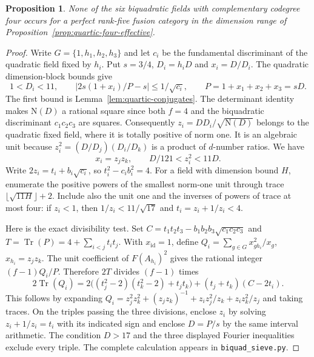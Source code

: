 \documentclass[11pt,a4paper]{article}
\newtheorem{proposition}[theorem]{Proposition}
\numberwithin{equation}{section}
\begin{document}
\begin{proposition}\label{prop:quartic-biquadratic-sieve}
None of the six biquadratic fields with complementary codegree four
occurs for a perfect rank-five fusion category in the dimension range
of Proposition~\ref{prop:quartic-four-effective}.
\end{proposition}
\begin{proof}
Write $G=\{1,h_1,h_2,h_3\}$ and let $c_i$ be the fundamental
discriminant of the quadratic field fixed by $h_i$. Put
$s=3/4$, $D_i=h_iD$ and $x_i=D/D_i$. The quadratic
dimension-block bounds give
\[
 1<D_i<11,
 \qquad
 |2s(1+x_i)/P-s|\le1/\sqrt{c_i},\qquad P=1+x_1+x_2+x_3=sD .
\]
The first bound is Lemma~\ref{lem:quartic-conjugates}.
The determinant identity makes $\mathrm N(D)$ a rational square since
both $f=4$ and the biquadratic discriminant $c_1c_2c_3$ are squares.
Consequently $z_i=DD_i/\sqrt{\mathrm N(D)}$ belongs to the quadratic
fixed field, where it is totally positive of norm one. It is an
algebraic unit because $z_i^2=(D/D_j)(D_i/D_k)$ is a product of
$d$-number ratios. We have
\[
 x_i=z_jz_k,\qquad D/121<z_i^2<11D .
\]
Write $2z_i=t_i+b_i\sqrt{c_i}$, so $t_i^2-c_i b_i^2=4$.
For a field with dimension bound $H$, enumerate the positive powers of the smallest norm-one unit through trace $\lfloor\sqrt{11H}\rfloor+2$. Include also the unit one and the inverses of powers of trace at most four: if $z_i<1$, then $1/z_i<11/\sqrt{17}$ and $t_i=z_i+1/z_i<4$.

Here is the exact divisibility test. Set
$C=t_1t_2t_3-b_1b_2b_3\sqrt{c_1c_2c_3}$ and
$T=\operatorname{Tr}(P)=4+\sum_{i<j}t_it_j$. With $x_{\mathrm{id}}=1$, define
$Q_i=\sum_{g\in G} x_{g h_i}^2/x_g$, $x_{h_i}=z_jz_k$.
The unit coefficient of $F(A_{h_i})^2$ gives the rational integer
$(f-1)Q_i/P$. Therefore $2T$ divides $(f-1)$ times
\[
 2\operatorname{Tr}(Q_i)
 =2\big((t_j^2-2)(t_k^2-2)+t_jt_k\big)
     +(t_j+t_k)(C-2t_i).
\]
This follows by expanding
$Q_i=z_j^2z_k^2+(z_jz_k)^{-1}
       +z_i z_j^2/z_k+z_i z_k^2/z_j$ and taking traces.
On the triples passing the three divisions, enclose $z_i$ by solving $z_i+1/z_i=t_i$ with its indicated sign and enclose $D=P/s$ by the same interval arithmetic. The condition $D>17$ and the three displayed Fourier inequalities exclude every triple. The complete calculation appears in \texttt{biquad\_sieve.py}.
\end{proof}
\end{document}
